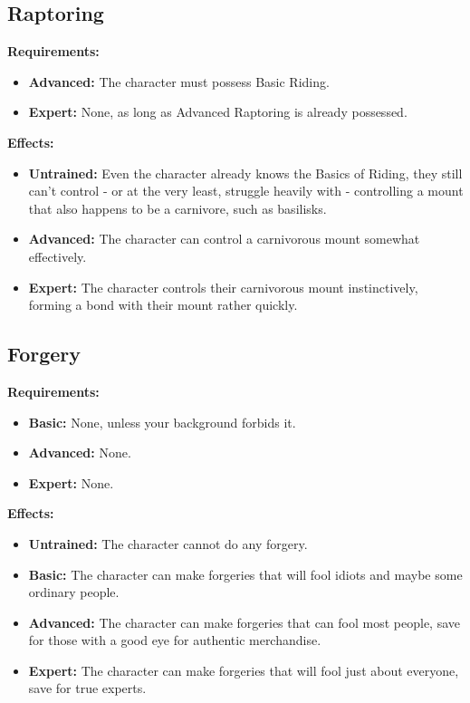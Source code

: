\documentclass[openany,10pt,a4paper]{book}
\begin{document}
\subsection{Raptoring}
\textbf{Requirements:}
\begin{itemize}
	\item \textbf{Advanced:} The character must possess Basic Riding.
	\item \textbf{Expert:} None, as long as Advanced Raptoring is already possessed.
\end{itemize}
\textbf{Effects:}
\begin{itemize}
	\item \textbf{Untrained:} Even the character already knows the Basics of Riding, they still can't control - or at the very least, struggle heavily with - controlling a mount that also happens to be a carnivore, such as basilisks.
	\item \textbf{Advanced:} The character can control a carnivorous mount somewhat effectively.
	\item \textbf{Expert:} The character controls their carnivorous mount instinctively, forming a bond with their mount rather quickly.
\end{itemize}
\subsection{Forgery}
\begin{table}[!ht]
\centering
{}
\end{table}
\textbf{Requirements:}
\begin{itemize}
	\item \textbf{Basic:} None, unless your background forbids it.
	\item \textbf{Advanced:} None.
	\item \textbf{Expert:} None.
\end{itemize}
\textbf{Effects:}
\begin{itemize}
	\item \textbf{Untrained:} The character cannot do any forgery.
	\item \textbf{Basic:} The character can make forgeries that will fool idiots and maybe some ordinary people.
	\item \textbf{Advanced:} The character can make forgeries that can fool most people, save for those with a good eye for authentic merchandise.
	\item \textbf{Expert:} The character can make forgeries that will fool just about everyone, save for true experts.
\end{itemize}\newpage
\end{document}
